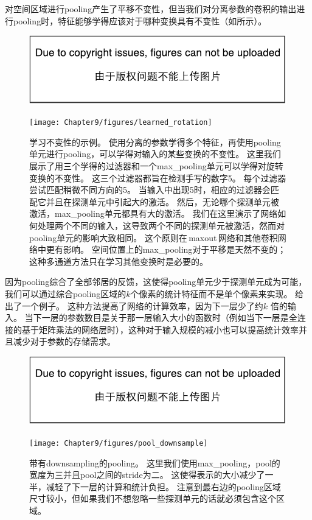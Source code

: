 对空间区域进行\gls{pooling}产生了平移不变性，但当我们对分离参数的卷积的输出进行\gls{pooling}时，特征能够学得应该对于哪种变换具有不变性（如所示）。
\begin{figure}[!htb]
\ifOpenSource
\centerline{\includegraphics{figure.pdf}}
\else
\centerline{\texttt{[image: Chapter9/figures/learned\_rotation]}}
\fi
\caption{学习不变性的示例。
使用分离的参数学得多个特征，再使用\gls{pooling}单元进行\gls{pooling}，可以学得对输入的某些变换的不变性。
这里我们展示了用三个学得的过滤器和一个\gls{max_pooling}单元可以学得对旋转变换的不变性。
这三个过滤器都旨在检测手写的数字5。
每个过滤器尝试匹配稍微不同方向的5。
当输入中出现5时，相应的过滤器会匹配它并且在探测单元中引起大的激活。
然后，无论哪个探测单元被激活，\gls{max_pooling}单元都具有大的激活。
我们在这里演示了网络如何处理两个不同的输入，这导致两个不同的探测单元被激活，然而对\gls{pooling}单元的影响大致相同。
这个原则在\,\gls{maxout}\,网络\citep{Goodfellow-et-al-ICML2013}和其他卷积网络中更有影响。
空间位置上的\gls{max_pooling}对于平移是天然不变的；这种多通道方法只在学习其他变换时是必要的。}
\label{fig:chap9_learned_rotation}
\end{figure}

 
因为\gls{pooling}综合了全部邻居的反馈，这使得\gls{pooling}单元少于探测单元成为可能，我们可以通过综合\gls{pooling}区域的$k$个像素的统计特征而不是单个像素来实现。
给出了一个例子。
这种方法提高了网络的计算效率，因为下一层少了约$k$ 倍的输入。
当下一层的参数数目是关于那一层输入大小的函数时（例如当下一层是全连接的基于矩阵乘法的网络层时），这种对于输入规模的减小也可以提高统计效率并且减少对于参数的存储需求。
\begin{figure}[!htb]
\ifOpenSource
\centerline{\includegraphics{figure.pdf}}
\else
\centerline{\texttt{[image: Chapter9/figures/pool\_downsample]}}
\fi
\caption{带有\gls{downsampling}的\gls{pooling}。
这里我们使用\gls{max_pooling}，\gls{pool}的宽度为三并且\gls{pool}之间的\gls{stride}为二。
这使得表示的大小减少了一半，减轻了下一层的计算和统计负担。
注意到最右边的\gls{pooling}区域尺寸较小，但如果我们不想忽略一些探测单元的话就必须包含这个区域。}
\label{fig:chap9_pool_downsample}
\end{figure}

